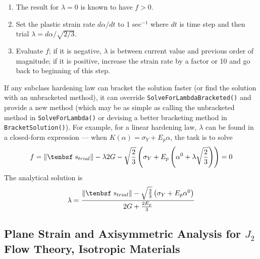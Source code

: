\documentclass[11pt]{article}
\def\dev{\hbox{\tenbsf s}}
\begin{document}
\begin{enumerate}

\item The result for $\lambda=0$ is known to have $f>0$.

\item Set the plastic strain rate $d\alpha/dt$ to 1 sec$^{-1}$ where $dt$ is time step and then trial $\lambda=d\alpha/\sqrt{2/3}$.

\item Evaluate $f$; if it is negative, $\lambda$ is between current value and previous order of magnitude; if it is positive, increase the strain rate by a factor or 10 and go back to beginning of this step.

\end{enumerate}

If any subclass hardening law can bracket the solution faster (or find the solution with an unbracketed method), it can override {\tt SolveForLambdaBracketed()} and provide a new method (which may be as simple as calling the unbracketed method in {\tt SolveForLambda()} or devising a better bracketing method in {\tt BracketSolution()}). For example, for a linear hardening law, $\lambda$ can be found in a closed-form expression --- when $K(\alpha)=\sigma_Y + E_p\alpha$, the task is to solve
\begin{equation}
      f =  \|\dev_{trial}\| - \lambda 2G -  \sqrt{2\over3} \left(\sigma_Y + E_p\left(\alpha^{0}+ \lambda \sqrt{2\over3}\right)\right) = 0
\end{equation}
The analytical solution is
\begin{equation}
      \lambda = { \|\dev_{trial}\| - \sqrt{2\over3}\left(\sigma_Y + E_p\alpha^{0} \right) \over  2G +  {2E_p\over3} }
\end{equation}

\subsection{Plane Strain and Axisymmetric Analysis for $J_2$ Flow Theory, Isotropic Materials}
\end{document}
